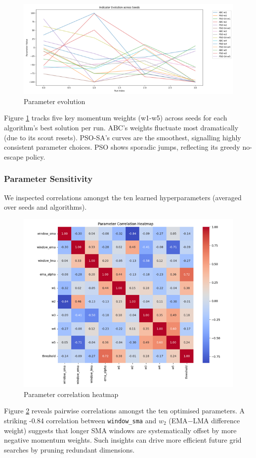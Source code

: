 \documentclass[a4paper, 12pt]{extarticle}
\begin{document}
\begin{figure}[h!]
    \centering
    \includegraphics[width=\textwidth]{./assets/parameter_weights.png}
    \caption{Parameter evolution}
    \label{fig:parameter}
\end{figure}
Figure \ref{fig:parameter} tracks five key momentum weights (w1-w5) across seeds for each algorithm's best solution per run. ABC's weights fluctuate most dramatically (due to its scout resets). PSO-SA's curves are the smoothest, signalling highly consistent parameter choices. PSO shows sporadic jumps, reflecting its greedy no-escape policy. 

\subsubsection{Parameter Sensitivity}
We inspected correlations amongst the ten learned hyperparameters (averaged over seeds and algorithms).
\begin{figure}[h!]
    \centering
    \includegraphics[width=\textwidth]{./assets/sensitivity.png}
    \caption{Parameter correlation heatmap}
    \label{fig:sensitivity}
\end{figure}
Figure \ref{fig:sensitivity} reveals pairwise correlations amongst the ten optimised parameters. A striking -0.84 correlation between \texttt{window\_sma} and $w_2$ (EMA$-$LMA difference weight) suggests that longer SMA windows are systematically offset by more negative momentum weights. Such insights can drive more efficient future grid searches by pruning redundant dimensions. 
\end{document}
